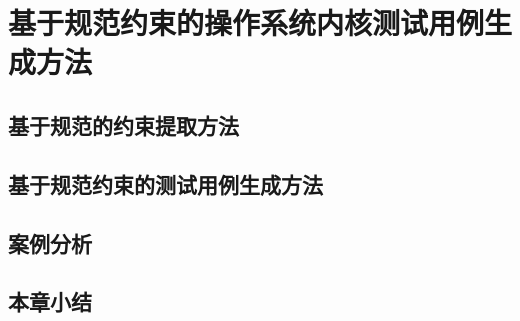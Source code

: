 
\chapter{基于规范约束的操作系统内核测试用例生成方法}
\section{基于规范的约束提取方法}
\section{基于规范约束的测试用例生成方法}
\section{案例分析}
\section{本章小结}
